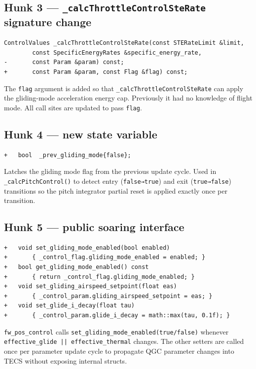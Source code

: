 \documentclass[12pt,a4paper]{article}
\begin{document}
\subsection{Hunk 3 — \texttt{\_calcThrottleControlSteRate} signature change}

\begin{lstlisting}[style=diff]
 	ControlValues _calcThrottleControlSteRate(const STERateLimit &limit,
		const SpecificEnergyRates &specific_energy_rate,
-		const Param &param) const;
+		const Param &param, const Flag &flag) const;
\end{lstlisting}
\begin{annotation}The \texttt{flag} argument is added so that \texttt{\_calcThrottleControlSteRate} can apply the gliding-mode acceleration energy cap. Previously it had no knowledge of flight mode. All call sites are updated to pass \texttt{flag}.\end{annotation}

\subsection{Hunk 4 — new state variable}

\begin{lstlisting}[style=diff]
+	bool  _prev_gliding_mode{false};
\end{lstlisting}
\begin{annotation}Latches the gliding mode flag from the previous update cycle. Used in \texttt{\_calcPitchControl()} to detect entry (\texttt{false→true}) and exit (\texttt{true→false}) transitions so the pitch integrator partial reset is applied exactly once per transition.\end{annotation}

\subsection{Hunk 5 — public soaring interface}

\begin{lstlisting}[style=diff]
+	void set_gliding_mode_enabled(bool enabled)
+	    { _control_flag.gliding_mode_enabled = enabled; }
+	bool get_gliding_mode_enabled() const
+	    { return _control_flag.gliding_mode_enabled; }
+	void set_gliding_airspeed_setpoint(float eas)
+	    { _control_param.gliding_airspeed_setpoint = eas; }
+	void set_glide_i_decay(float tau)
+	    { _control_param.glide_i_decay = math::max(tau, 0.1f); }
\end{lstlisting}
\begin{annotation}\texttt{fw\_pos\_control} calls \texttt{set\_gliding\_mode\_enabled(true/false)} whenever \texttt{effective\_glide || effective\_thermal} changes. The other setters are called once per parameter update cycle to propagate QGC parameter changes into TECS without exposing internal structs.\end{annotation}
\end{document}

